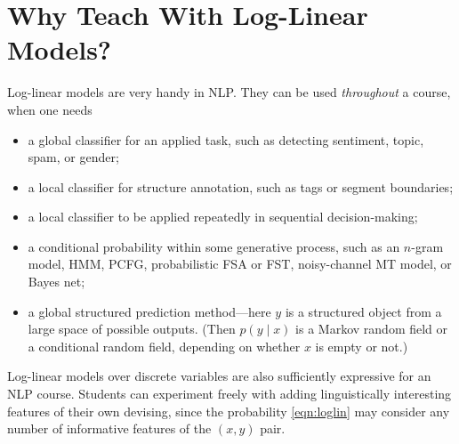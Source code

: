 \documentclass[11pt,letterpaper]{article}
\begin{document}
\section{Why Teach With Log-Linear Models?}

Log-linear models are very handy in NLP.  They can be used {\em throughout} 
a course, when one needs 
\begin{itemize}
\item a global classifier for an applied task, such as detecting
  sentiment, topic, spam, or gender;
\item a local classifier for structure annotation,
  such as tags or segment boundaries;
\item a local classifier to be applied repeatedly in sequential decision-making;
\item a conditional probability within some generative process, such
  as an $n$-gram model, HMM, PCFG, probabilistic FSA or FST, noisy-channel MT model,
  or Bayes net;
\item a global structured prediction method---here $y$ is a structured
  object from a large space of possible outputs.  (Then $p(y \mid x)$ is a
  Markov random field or a conditional random field, depending on whether 
  $x$ is empty or not.)
\end{itemize}  

Log-linear models over discrete variables are also sufficiently
expressive for an NLP course.  Students can experiment freely with
adding linguistically interesting features of their own devising,
since the probability \eqref{eqn:loglin} may consider any number of
informative features of the $(x,y)$ pair.
\end{document}
